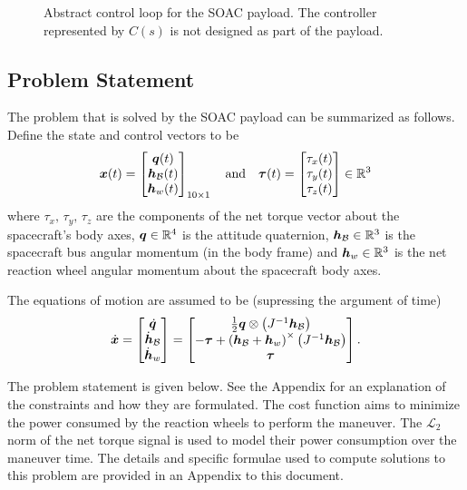 \documentclass[10pt]{article}
\begin{document}
\begin{figure}[bth]
\centering

\caption{Abstract control loop for the SOAC payload. The controller represented by $C(s)$ is not designed as part of the payload.}
\label{fig:soac_loop}
\end{figure}

\subsection{Problem Statement}

The problem that is solved by the SOAC payload can be summarized as follows. Define the state and control vectors to be
\begin{equation}
\bm{x}(t) = \begin{bmatrix}
\bm{q}(t) \\ \bm{h}_{\mathcal{B}}(t) \\ \bm{h}_w(t)
\end{bmatrix}_{10\times 1} \quad \text{and} \quad \bm{\tau}(t) = \begin{bmatrix}
\tau_x(t) \\ \tau_y(t) \\ \tau_z(t)
\end{bmatrix} \in {\mathbb{R}}^3
\label{eq:state_control}
\end{equation}
where $\tau_x,\,\tau_y,\,\tau_z$ are the components of the net torque vector about the spacecraft's body axes, $\bm{q}\in{\mathbb{R}}^4$ is the attitude quaternion, $\bm{h}_{\mathcal{B}}\in{\mathbb{R}}^3$ is the spacecraft bus angular momentum (in the body frame) and $\bm{h}_w\in{\mathbb{R}}^3$ is the net reaction wheel angular momentum about the spacecraft body axes. 

The equations of motion are assumed to be (supressing the argument of time)
\begin{equation}
\dot{\bm{x}} = \begin{bmatrix}
\dot{\bm{q}} \\ \dot{\bm{h}}_{\mathcal{B}} \\ \dot{\bm{h}}_w
\end{bmatrix} = \begin{bmatrix}
\tfrac{1}{2} \bm{q} \otimes \left(J^{-1} \bm{h}_{\mathcal{B}} \right) \\
-\bm{\tau} + \left( \bm{h}_{\mathcal{B}} + \bm{h}_w \right)^{\times} \left( J^{-1} \bm{h}_{\mathcal{B}} \right) \\
\bm{\tau}
\end{bmatrix}.
\label{eq:eqms}
\end{equation}

The problem statement is given below. See the Appendix for an explanation of the constraints and how they are formulated. The cost function aims to minimize the power consumed by the reaction wheels to perform the maneuver. The $\mathcal{L}_2$ norm of the net torque signal is used to model their power consumption over the maneuver time. The details and specific formulae used to compute solutions to this problem are provided in an Appendix to this document.
\end{document}
